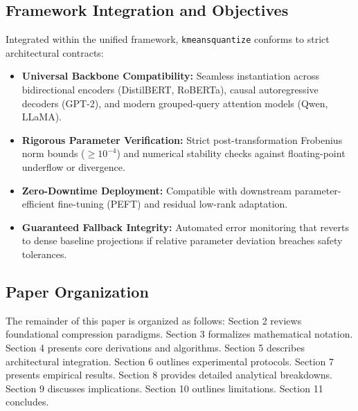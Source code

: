 \subsection{Framework Integration and Objectives}
Integrated within the unified framework, \texttt{kmeansquantize} conforms to strict architectural contracts:
\begin{itemize}
\item \textbf{Universal Backbone Compatibility:} Seamless instantiation across bidirectional encoders (DistilBERT, RoBERTa), causal autoregressive decoders (GPT-2), and modern grouped-query attention models (Qwen, LLaMA).
\item \textbf{Rigorous Parameter Verification:} Strict post-transformation Frobenius norm bounds ($\ge 10^{-4}$) and numerical stability checks against floating-point underflow or divergence.
\item \textbf{Zero-Downtime Deployment:} Compatible with downstream parameter-efficient fine-tuning (PEFT) and residual low-rank adaptation.
\item \textbf{Guaranteed Fallback Integrity:} Automated error monitoring that reverts to dense baseline projections if relative parameter deviation breaches safety tolerances.
\end{itemize}

\subsection{Paper Organization}
The remainder of this paper is organized as follows: Section 2 reviews foundational compression paradigms. Section 3 formalizes mathematical notation. Section 4 presents core derivations and algorithms. Section 5 describes architectural integration. Section 6 outlines experimental protocols. Section 7 presents empirical results. Section 8 provides detailed analytical breakdowns. Section 9 discusses implications. Section 10 outlines limitations. Section 11 concludes.
